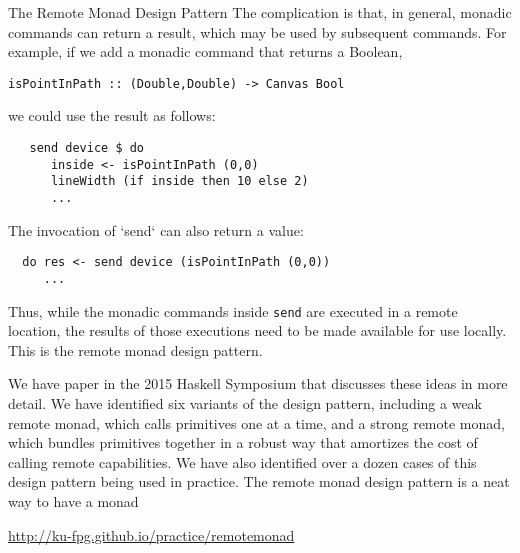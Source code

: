 \begin{hcarentry}[new]{The Remote Monad Design Pattern}
The complication is that, in general, monadic commands can return a
result, which may be used by subsequent commands.  For example, if we
add a monadic command that returns a Boolean,

\begin{verbatim}
isPointInPath :: (Double,Double) -> Canvas Bool
\end{verbatim}

we could use the result as follows:

\begin{verbatim}
   send device $ do
      inside <- isPointInPath (0,0)
      lineWidth (if inside then 10 else 2)
      ...
\end{verbatim}

The invocation of `send` can also return a value:

\begin{verbatim}
  do res <- send device (isPointInPath (0,0))
     ...
\end{verbatim}

Thus, while the monadic commands inside \verb`send` are executed in a
remote location, the results of those executions need to be made
available for use locally.  This is the remote monad design
pattern.

We have paper in the 2015 Haskell Symposium that discusses these ideas in more detail.
We have identified six variants of the design pattern, including
a weak remote monad, which calls primitives one at a time, and
a strong remote monad, which bundles primitives together in a robust way that
amortizes the cost of calling remote capabilities.
We have also identified over a dozen cases of this design pattern being used in practice. 
The remote monad design pattern is a neat way to have a monad 

\FurtherReading
\begin{compactitem}
\item
  \url{http://ku-fpg.github.io/practice/remotemonad}
\end{compactitem}
\end{hcarentry}
